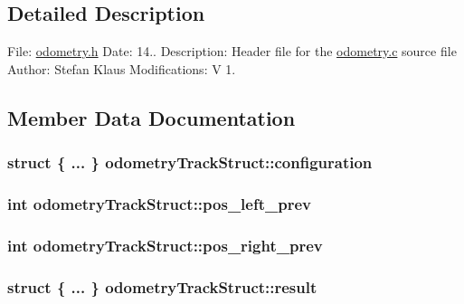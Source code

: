 \subsection{Detailed Description}
File\+: \hyperlink{odometry_8h}{odometry.\+h} Date\+: 14.. Description\+: Header file for the \hyperlink{odometry_8c}{odometry.\+c} source file Author\+: Stefan Klaus Modifications\+: V 1. 

\subsection{Member Data Documentation}
\hypertarget{structodometry_track_struct_aa6bba4d091ae45c6fc7cd65a0ae60f5c}{
\subsubsection[{configuration}]{\setlength{\rightskip}{0pt plus 5cm}struct \{ ... \}   odometry\+Track\+Struct\+::configuration}}\label{structodometry_track_struct_aa6bba4d091ae45c6fc7cd65a0ae60f5c}
\hypertarget{structodometry_track_struct_a239492167b9c9189a749caba8f4bba24}{
\subsubsection[{pos\+\_\+left\+\_\+prev}]{\setlength{\rightskip}{0pt plus 5cm}int odometry\+Track\+Struct\+::pos\+\_\+left\+\_\+prev}}\label{structodometry_track_struct_a239492167b9c9189a749caba8f4bba24}
\hypertarget{structodometry_track_struct_a20071e254af74994c28ef0973c9b449e}{
\subsubsection[{pos\+\_\+right\+\_\+prev}]{\setlength{\rightskip}{0pt plus 5cm}int odometry\+Track\+Struct\+::pos\+\_\+right\+\_\+prev}}\label{structodometry_track_struct_a20071e254af74994c28ef0973c9b449e}
\hypertarget{structodometry_track_struct_a95e39426ad6235eba90f1fd135a5db06}{
\subsubsection[{result}]{\setlength{\rightskip}{0pt plus 5cm}struct \{ ... \}   odometry\+Track\+Struct\+::result}}\label{structodometry_track_struct_a95e39426ad6235eba90f1fd135a5db06}
